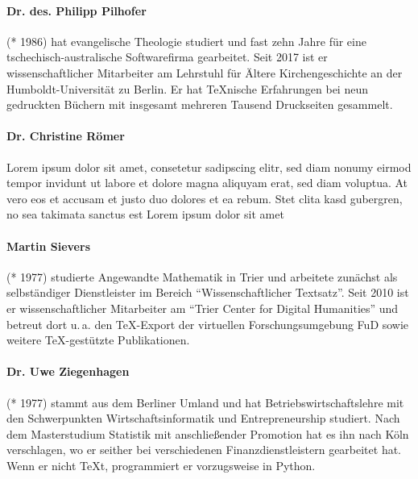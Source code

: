 \paragraph{Dr. des. Philipp Pilhofer} (* 1986) hat evangelische Theologie studiert und fast zehn Jahre für eine tschechisch-australische Softwarefirma gearbeitet. Seit 2017 ist er wissenschaftlicher Mitarbeiter am Lehrstuhl für Ältere Kirchengeschichte an der Humboldt-Universität zu Berlin. Er hat \TeX{}nische Erfahrungen bei neun gedruckten Büchern mit insgesamt mehreren Tausend Druckseiten gesammelt.

\paragraph{Dr. Christine Römer} Lorem ipsum dolor sit amet, consetetur sadipscing elitr, sed diam nonumy eirmod tempor invidunt ut labore et dolore magna aliquyam erat, sed diam voluptua. At vero eos et accusam et justo duo dolores et ea rebum. Stet clita kasd gubergren, no sea takimata sanctus est Lorem ipsum dolor sit amet

\paragraph{Martin Sievers} (* 1977) studierte Angewandte Mathematik in Trier und arbeitete zunächst als selbständiger Dienstleister im Bereich \enquote{Wissenschaftlicher Textsatz}. Seit 2010 ist er wissenschaftlicher Mitarbeiter am \enquote{Trier Center for Digital Humanities} und betreut dort u.\,a. den \TeX-Export der virtuellen Forschungsumgebung FuD sowie weitere \TeX-gestützte Publikationen.

\paragraph{Dr. Uwe Ziegenhagen} (* 1977) stammt aus dem Berliner Umland und hat Betriebswirtschaftslehre mit den Schwerpunkten Wirtschaftsinformatik und Entrepreneurship studiert. Nach dem Masterstudium Statistik mit anschließender Promotion hat es ihn nach Köln verschlagen, wo er seither bei verschiedenen Finanzdienstleistern gearbeitet hat. Wenn er nicht \TeX t, programmiert er vorzugsweise in Python.

